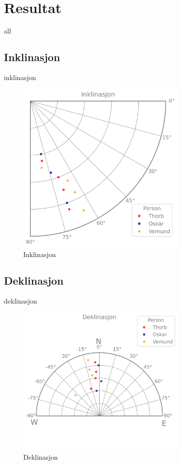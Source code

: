 \section{Resultat}

{all}

\subsection{Inklinasjon}

{inklinasjon}

\begin{figure}
    \centering
    \includegraphics[width=0.75\textwidth]{Plots/inclination.png}
    \caption{Inklinasjon}
    \label{fig:plot_inklination}
\end{figure}


\subsection{Deklinasjon}

{deklinasjon}

\begin{figure}
    \centering
    \includegraphics[width=0.75\textwidth]{Plots/declination.png}
    \caption{Deklinasjon}
    \label{fig:plot_declination}
\end{figure}